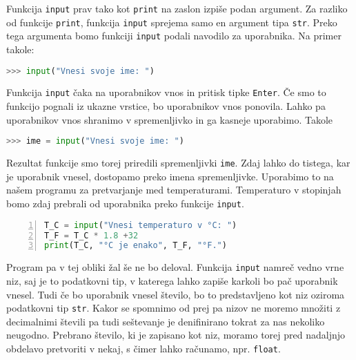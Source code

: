 Funkcija \texttt{input} prav tako kot \texttt{print} na zaslon izpiše podan argument. Za razliko od funkcije \texttt{print}, funkcija \texttt{input} sprejema samo en argument tipa \texttt{str}. Preko tega argumenta bomo funkciji \texttt{input} podali navodilo za uporabnika. Na primer takole:
\begin{lstlisting}[language=Python]
>>> input("Vnesi svoje ime: ")
\end{lstlisting}
Funkcija \texttt{input} čaka na uporabnikov vnos in pritisk tipke \texttt{Enter}. Če smo to funkcijo pognali iz ukazne vrstice, bo uporabnikov vnos ponovila. Lahko pa uporabnikov vnos shranimo v spremenljivko in ga kasneje uporabimo. Takole
\begin{lstlisting}[language=Python]
>>> ime = input("Vnesi svoje ime: ")
\end{lstlisting}
Rezultat funkcije \texttt{} smo torej priredili spremenljivki \texttt{ime}. Zdaj lahko do tistega, kar je uporabnik vnesel, dostopamo preko imena spremenljivke. Uporabimo to na našem programu za pretvarjanje med temperaturami. Temperaturo v stopinjah bomo zdaj prebrali od uporabnika preko funkcije \texttt{input}.
\begin{lstlisting}[language=Python,numbers=left]
T_C = input("Vnesi temperaturo v °C: ")
T_F = T_C * 1.8 +32
print(T_C, "°C je enako", T_F, "°F.")
\end{lstlisting}
Program pa v tej obliki žal še ne bo deloval. Funkcija \texttt{input} namreč vedno vrne niz, saj je to podatkovni tip, v katerega lahko zapiše karkoli bo pač uporabnik vnesel. Tudi če bo uporabnik vnesel število, bo to predstavljeno kot niz oziroma podatkovni tip \texttt{str}. Kakor se spomnimo od prej pa nizov ne moremo množiti z decimalnimi števili pa tudi seštevanje je denifinirano tokrat za nas nekoliko neugodno. Prebrano število, ki je zapisano kot niz, moramo torej pred nadaljnjo obdelavo pretvoriti v nekaj, s čimer lahko računamo, npr. \texttt{float}. 

